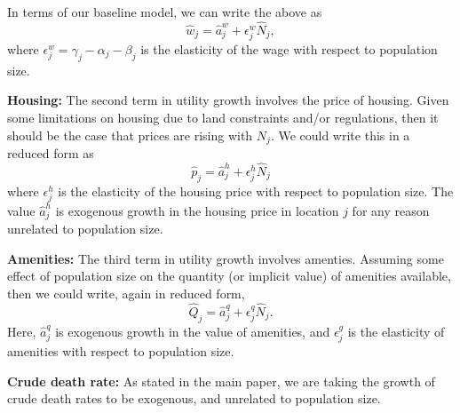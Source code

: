 \documentclass[10pt]{article}
\begin{document}
In terms of our baseline model, we can write the above as
\begin{equation}
    \hat{w}_j = \hat{a}^w_j + \epsilon^w_j \hat{N}_j,
\end{equation}
where $\epsilon^w_j = \gamma_j - \alpha_j - \beta_j$ is the elasticity of the wage with respect to population size. 

\textbf{Housing:} The second term in utility growth involves the price of housing. Given some limitations on housing due to land constraints and/or regulations, then it should be the case that prices are rising with $N_j$. We could write this in a reduced form as
\begin{equation}
    \hat{p}_j = \hat{a}^h_j + \epsilon_j^h \hat{N}_j
\end{equation}
where $\epsilon^h_j$ is the elasticity of the housing price with respect to population size. The value $\hat{a}^h_j$ is exogenous growth in the housing price in location $j$ for any reason unrelated to population size. 

\textbf{Amenities:} The third term in utility growth involves amenties. Assuming some effect of population size on the quantity (or implicit value) of amenities available, then we could write, again in reduced form,
\begin{equation}
    \hat{Q}_j = \hat{a}^q_j + \epsilon^q_j \hat{N}_j.
\end{equation}
Here, $\hat{a}^q_j$ is exogenous growth in the value of amenities, and $\epsilon^g_j$ is the elasticity of amenities with respect to population size. 

\textbf{Crude death rate:} As stated in the main paper, we are taking the growth of crude death rates to be exogenous, and unrelated to population size.
\end{document}
